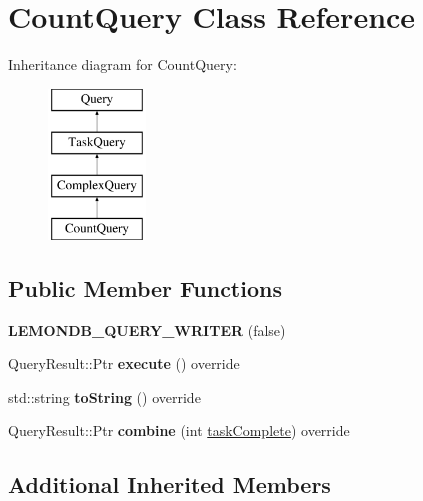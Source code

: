 \hypertarget{class_count_query}{}\section{Count\+Query Class Reference}
\label{class_count_query}
Inheritance diagram for Count\+Query\+:\begin{figure}[H]
\begin{center}
\leavevmode
\includegraphics[height=4.000000cm]{class_count_query}
\end{center}
\end{figure}
\subsection*{Public Member Functions}
\begin{DoxyCompactItemize}
\item 
\mbox{\label{class_count_query_a00049389ec33e0dbbf931154f3c1e29a}} 
{\bfseries L\+E\+M\+O\+N\+D\+B\+\_\+\+Q\+U\+E\+R\+Y\+\_\+\+W\+R\+I\+T\+ER} (false)
\item 
\mbox{\label{class_count_query_a4a5b116eb6efe197d765181e0f9913c0}} 
Query\+Result\+::\+Ptr {\bfseries execute} () override
\item 
\mbox{\label{class_count_query_a23cf22e71dc52c0cf61eecdc01ca9dea}} 
std\+::string {\bfseries to\+String} () override
\item 
\mbox{\label{class_count_query_a6eea6ab67e3b1f5d0589a47207192002}} 
Query\+Result\+::\+Ptr {\bfseries combine} (int \hyperlink{class_task_query_a3dc3e4c56ddea8ff025239fd9da358d3}{task\+Complete}) override
\end{DoxyCompactItemize}
\subsection*{Additional Inherited Members}


